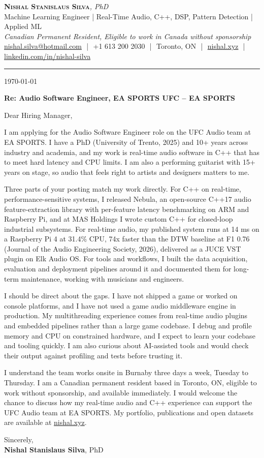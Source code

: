 \documentclass[11pt]{article}
\makeatletter
\newcommand{\clName}{Nishal Stanislaus Silva}
\newcommand{\clEmail}{nishal.silva@hotmail.com}
\newcommand{\clPhone}{+1 613 200 2030}
\newcommand{\clCity}{Toronto, ON}
\newcommand{\clSite}{https://nishal.xyz}
\newcommand{\clLinkedIn}{https://www.linkedin.com/in/nishal-silva}
\newcommand{\clStatus}{Canadian Permanent Resident, Eligible to work in Canada without sponsorship}
\newcommand{\clTagline}{Machine Learning Engineer | Real-Time Audio, C++, DSP, Pattern Detection | Applied ML}
\newcommand{\clRole}{Audio Software Engineer, EA SPORTS UFC}
\newcommand{\clCompany}{EA SPORTS}
\newcommand{\clTeam}{the UFC Audio team}
\newcommand{\clAddressee}{Dear Hiring Manager,}
\makeatother
\begin{document}
\pagestyle{empty}

\begin{center}
    {\LARGE \scshape \textbf{\clName}}{\large \textit{, PhD}}
    \\[1pt]
    {\small \clTagline}
    \\[1pt]
    {\footnotesize\textit{\clStatus}}
    \\[1pt]
    {\small
    \href{mailto:\clEmail}{\clEmail}
    \,\,|\,\, \clPhone
    \,\,|\,\, \clCity
    \,\,|\,\, \href{\clSite}{nishal.xyz}
    \,\,|\,\, \href{\clLinkedIn}{linkedin.com/in/nishal-silva}}
\end{center}

\rule{\linewidth}{0.4pt}\vspace{0.6em}

\today

\textbf{Re: \clRole{} -- \clCompany{}}

\clAddressee

I am applying for the Audio Software Engineer role on the UFC Audio team at EA SPORTS. I have a PhD (University of Trento, 2025) and 10+ years across industry and academia, and my work is real-time audio software in C++ that has to meet hard latency and CPU limits. I am also a performing guitarist with 15+ years on stage, so audio that feels right to artists and designers matters to me.

Three parts of your posting match my work directly. For C++ on real-time, performance-sensitive systems, I released Nebula, an open-source C++17 audio feature-extraction library with per-feature latency benchmarking on ARM and Raspberry Pi, and at MAS Holdings I wrote custom C++ for closed-loop industrial subsystems. For real-time audio, my published system runs at 14 ms on a Raspberry Pi 4 at 31.4\% CPU, 74x faster than the DTW baseline at F1 0.76 (Journal of the Audio Engineering Society, 2026), delivered as a JUCE VST plugin on Elk Audio OS. For tools and workflows, I built the data acquisition, evaluation and deployment pipelines around it and documented them for long-term maintenance, working with musicians and engineers.

I should be direct about the gaps. I have not shipped a game or worked on console platforms, and I have not used a game audio middleware engine in production. My multithreading experience comes from real-time audio plugins and embedded pipelines rather than a large game codebase. I debug and profile memory and CPU on constrained hardware, and I expect to learn your codebase and tooling quickly. I am also curious about AI-assisted tools and would check their output against profiling and tests before trusting it.

I understand the team works onsite in Burnaby three days a week, Tuesday to Thursday. I am a Canadian permanent resident based in \clCity{}, eligible to work without sponsorship, and available immediately. I would welcome the chance to discuss how my real-time audio and C++ experience can support \clTeam{} at \clCompany{}. My portfolio, publications and open datasets are available at \href{\clSite}{nishal.xyz}.

\vspace{12pt}
Sincerely,\\[2pt]
\textbf{\clName}, PhD
\end{document}
